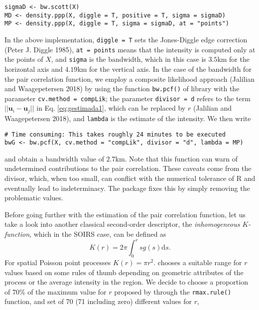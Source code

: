 \begin{verbatim}
sigmaD <- bw.scott(X)
MD <- density.ppp(X, diggle = T, positive = T, sigma = sigmaD)
MP <- density.ppp(X, diggle = T, sigma = sigmaD, at = "points")
\end{verbatim}

In the above implementation, \texttt{diggle\ =\ T} sets the Jones-Diggle edge correction (Peter J. Diggle 1985), \texttt{at\ =\ \textquotesingle{}points\textquotesingle{}} means that the intensity is computed only at the points of \(X\), and \texttt{sigma} is the bandwidth, which in this case is \(3.5\)km for the horizontal axis and \(4.19\)km for the vertical axis. In the case of the bandwidth for the pair correlation function, we employ a composite likelihood approach (Jalilian and Waagepetersen 2018) by using the function \texttt{bw.pcf()} of library  with the parameter \texttt{cv.method\ =\ \textquotesingle{}compLik\textquotesingle{}}; the parameter \texttt{divisor\ =\ \textquotesingle{}d\textquotesingle{}} refers to the term \(||\mathbf{u}_{i}-\mathbf{u}_{j}||\) in Eq. \eqref{eq:gestimada1}, which can be replaced by \(r\) (Jalilian and Waagepetersen 2018), and \texttt{lambda} is the estimate of the intensity. We then write

\begin{verbatim}
# Time consuming: This takes roughly 24 minutes to be executed 
bwG <- bw.pcf(X, cv.method = "compLik", divisor = "d", lambda = MP)
\end{verbatim}

and obtain a bandwidth value of \(2.7\)km. Note that this function can warn of undetermined contributions to the pair correlation. These caveats come from the divisor, which, when too small, can conflict with the numerical tolerance of R and eventually lead to indeterminacy. The  package fixes this by simply removing the problematic values.

Before going further with the estimation of the pair correlation function, let us take a look into another classical second-order descriptor, the \emph{inhomogeneous \(K\)-function}, which in the SOIRS case, can be defined as
\[
    K(r)=2\pi \int_0^r sg(s)\text{d} s.
\]
For spatial Poisson point processes \(K(r)=\pi r^2\).  chooses a suitable range for \(r\) values based on some rules of thumb depending on geometric attributes of the process or the average intensity in the region. We decide to choose a proportion of 70\% of the maximum value for \(r\) proposed by  through the \texttt{rmax.rule()} function, and set of 70 (71 including zero) different values for \(r\),

